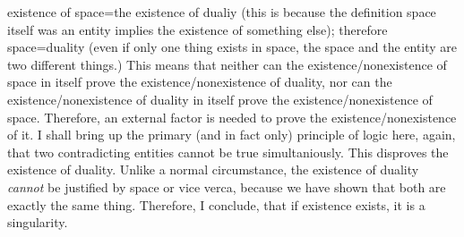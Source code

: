 \documentclass{article}
\newcommand{\tit}[1]{\textit{#1}}
\begin{document}
existence of space=the existence of dualiy (this is because the definition space itself was an entity implies the existence of something else); therefore space=duality (even if only one thing exists in space, the space and the entity are two different things.) This means that neither can the existence/nonexistence of space in itself prove the existence/nonexistence of duality, nor can the existence/nonexistence of duality in itself prove the existence/nonexistence of space. Therefore, an external factor is needed to prove the existence/nonexistence of it. I shall bring up the primary (and in fact only) principle of logic here, again, that two contradicting entities cannot be true simultaniously. This disproves the existence of duality. Unlike a normal circumstance, the existence of duality \tit{cannot} be justified by space or vice verca, because we have shown that both are exactly the same thing. Therefore, I conclude, that if existence exists, it is a singularity. 
\end{document}
